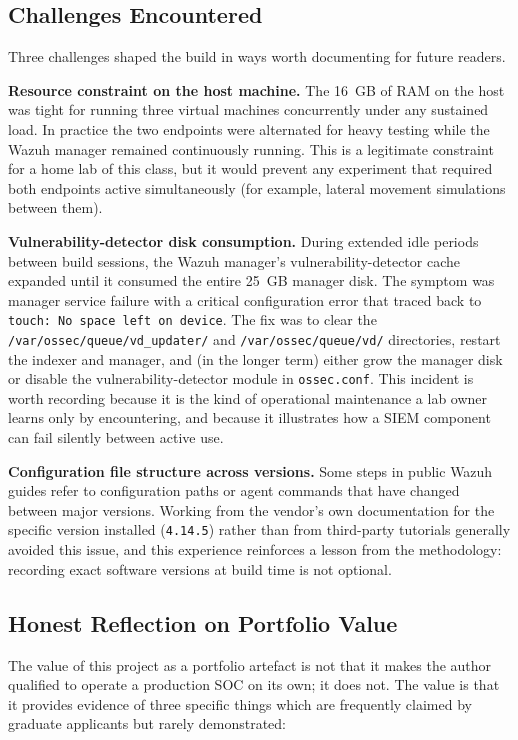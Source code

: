 \subsection{Challenges Encountered}

Three challenges shaped the build in ways worth documenting for future
readers.

\textbf{Resource constraint on the host machine.} The 16~GB of RAM on the
host was tight for running three virtual machines concurrently under any
sustained load. In practice the two endpoints were alternated for heavy
testing while the Wazuh manager remained continuously running. This is a
legitimate constraint for a home lab of this class, but it would prevent
any experiment that required both endpoints active simultaneously (for
example, lateral movement simulations between them).

\textbf{Vulnerability-detector disk consumption.} During extended idle
periods between build sessions, the Wazuh manager's vulnerability-detector
cache expanded until it consumed the entire 25~GB manager disk. The
symptom was manager service failure with a critical configuration error
that traced back to \texttt{touch: No space left on device}. The fix was
to clear the \texttt{/var/ossec/queue/vd\_updater/} and
\texttt{/var/ossec/queue/vd/} directories, restart the indexer and
manager, and (in the longer term) either grow the manager disk or disable
the vulnerability-detector module in \texttt{ossec.conf}. This incident is
worth recording because it is the kind of operational maintenance a lab
owner learns only by encountering, and because it illustrates how a SIEM
component can fail silently between active use.

\textbf{Configuration file structure across versions.} Some steps in
public Wazuh guides refer to configuration paths or agent commands that
have changed between major versions. Working from the vendor's own
documentation for the specific version installed
(\texttt{4.14.5}) rather than from third-party tutorials generally
avoided this issue, and this experience reinforces a lesson from the
methodology: recording exact software versions at build time is not
optional.

\subsection{Honest Reflection on Portfolio Value}

The value of this project as a portfolio artefact is not that it makes the
author qualified to operate a production SOC on its own; it does not.
The value is that it provides evidence of three specific things which are
frequently claimed by graduate applicants but rarely demonstrated:

